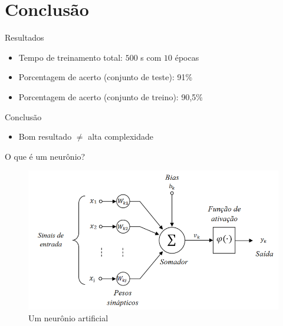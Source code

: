 \documentclass[xcolor=dvipsnames]{beamer}
\begin{document}
    \section{Conclusão}
        \begin{frame}{Resultados}
            \begin{itemize}
                \item Tempo de treinamento total: $500$ s com $10$ épocas
                \item Porcentagem de acerto (conjunto de teste): 91\%
                \item Porcentagem de acerto (conjunto de treino): 90,5\%
            \end{itemize}
        \end{frame}
        \begin{frame}{Conclusão}
            \begin{itemize}
                \item Bom resultado $\neq$ alta complexidade 
            \end{itemize}
        \end{frame}
        \begin{frame}{O que é um neurônio?}
            \begin{figure}
                \centering
                \includegraphics[scale=0.35]{Imagens/neuronio.png}
                \caption{Um neurônio artificial}
                \label{fig:neuronio}
            \end{figure}
        \end{frame}
\end{document}
